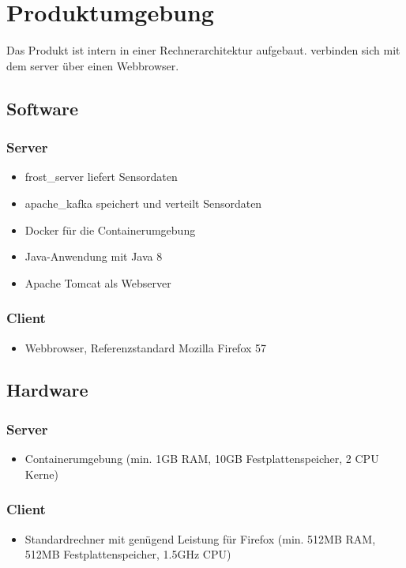 \chapter{Produktumgebung}
Das Produkt ist intern in einer  Rechnerarchitektur aufgebaut.  verbinden sich mit dem \gls{server} über einen Webbrowser.
\section{Software}
\subsection{Server}
\begin{itemize}
	\item \gls{frost_server} liefert Sensordaten
	\item \gls{apache_kafka} speichert und verteilt Sensordaten
	\item Docker für die Containerumgebung
	\item Java-Anwendung mit Java 8
	\item Apache Tomcat als Webserver
\end{itemize}
\subsection{Client}
\begin{itemize}
	\item Webbrowser, Referenzstandard Mozilla Firefox 57
\end{itemize}
\section{Hardware}
\subsection{Server}
\begin{itemize}
	\item Containerumgebung (min. 1GB RAM, 10GB Festplattenspeicher, 2 CPU Kerne)
\end{itemize}
\subsection{Client}
\begin{itemize}
	\item Standardrechner mit genügend Leistung für Firefox (min. 512MB RAM, 512MB Festplattenspeicher, 1.5GHz CPU)
\end{itemize}